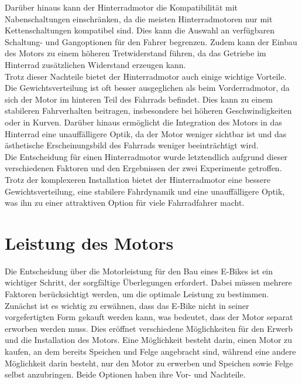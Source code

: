 Darüber hinaus kann der Hinterradmotor die Kompatibilität mit Nabenschaltungen einschränken, da die meisten Hinterradmotoren nur mit Kettenschaltungen kompatibel sind.
Dies kann die Auswahl an verfügbaren Schaltung- und Gangoptionen für den Fahrer begrenzen.
Zudem kann der Einbau des Motors zu einem höheren Tretwiderstand führen, da das Getriebe im Hinterrad zusätzlichen Widerstand erzeugen kann.\\

Trotz dieser Nachteile bietet der Hinterradmotor auch einige wichtige Vorteile.
Die Gewichtsverteilung ist oft besser ausgeglichen als beim Vorderradmotor, da sich der Motor im hinteren Teil des Fahrrads befindet.
Dies kann zu einem stabileren Fahrverhalten beitragen, insbesondere bei höheren Geschwindigkeiten oder in Kurven.
Darüber hinaus ermöglicht die Integration des Motors in das Hinterrad eine unauffälligere Optik, da der Motor weniger sichtbar ist und das ästhetische Erscheinungsbild des Fahrrads weniger beeinträchtigt wird.\\

Die Entscheidung für einen Hinterradmotor wurde letztendlich aufgrund dieser verschiedenen Faktoren und den Ergebnissen der zwei Experimente getroffen.
Trotz der komplexeren Installation bietet der Hinterradmotor eine bessere Gewichtsverteilung, eine stabilere Fahrdynamik und eine unauffälligere Optik, was ihn zu einer attraktiven Option für viele Fahrradfahrer macht.\\

\section{Leistung des Motors}

Die Entscheidung über die Motorleistung für den Bau eines E-Bikes ist ein wichtiger Schritt, der sorgfältige Überlegungen erfordert.
Dabei müssen mehrere Faktoren berücksichtigt werden, um die optimale Leistung zu bestimmen.\\

Zunächst ist es wichtig zu erwähnen, dass das E-Bike nicht in seiner vorgefertigten Form gekauft werden kann, was bedeutet, dass der Motor separat erworben werden muss.
Dies eröffnet verschiedene Möglichkeiten für den Erwerb und die Installation des Motors.
Eine Möglichkeit besteht darin, einen Motor zu kaufen, an dem bereits Speichen und Felge angebracht sind, während eine andere Möglichkeit darin besteht, nur den Motor zu erwerben und Speichen sowie Felge selbst anzubringen.
Beide Optionen haben ihre Vor- und Nachteile.\\

